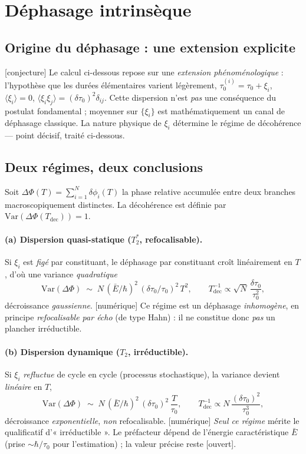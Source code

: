 \documentclass[11pt,a4paper]{article}
\newcommand{\statut}[1]{{\footnotesize\textsf{[#1]}}}
\theoremstyle{plain}
\theoremstyle{definition}
\theoremstyle{remark}
\begin{document}
\section{D\'ephasage intrins\`eque}\label{sec:deco}
\subsection{Origine du d\'ephasage : une extension explicite}\label{sec:disp}
\statut{conjecture} Le calcul ci-dessous repose sur une \emph{extension
ph\'enom\'enologique} : l'hypoth\`ese que les dur\'ees \'el\'ementaires varient l\'eg\`erement,
$\tau_0^{(i)}=\tau_0+\xi_i$, $\langle\xi_i\rangle=0$,
$\langle\xi_i\xi_j\rangle=(\delta\tau_0)^2\delta_{ij}$. Cette dispersion n'est
\emph{pas} une cons\'equence du postulat fondamental ; moyenner sur $\{\xi_i\}$ est
math\'ematiquement un canal de d\'ephasage classique. La nature physique de $\xi_i$
d\'etermine le r\'egime de d\'ecoh\'erence --- point d\'ecisif, trait\'e ci-dessous.

\subsection{Deux r\'egimes, deux conclusions}
Soit $\Delta\Phi(T)=\sum_{i=1}^{N}\delta\phi_i(T)$ la phase relative accumul\'ee entre
deux branches macroscopiquement distinctes. La d\'ecoh\'erence est d\'efinie par
$\mathrm{Var}(\Delta\Phi(T_{\mathrm{dec}}))=1$.

\paragraph{(a) Dispersion quasi-statique ($T_2^\ast$, refocalisable).} Si $\xi_i$ est
\emph{fig\'e} par constituant, le d\'ephasage par constituant cro\^it lin\'eairement en $T$,
d'o\`u une variance \emph{quadratique}
\[
\mathrm{Var}(\Delta\Phi)\;\sim\; N\,(\bar E/\hbar)^2\,(\delta\tau_0/\tau_0)^2\,T^2,
\qquad
T_{\mathrm{dec}}^{-1}\propto \sqrt{N}\,\frac{\delta\tau_0}{\tau_0^2},
\]
d\'ecroissance \emph{gaussienne}. \statut{num\'erique} Ce r\'egime est un d\'ephasage
\emph{inhomog\`ene}, en principe \emph{refocalisable par \'echo} (de type Hahn) : il
ne constitue donc \emph{pas} un plancher irr\'eductible.

\paragraph{(b) Dispersion dynamique ($T_2$, irr\'eductible).} Si $\xi_i$ \emph{refluctue}
de cycle en cycle (processus stochastique), la variance devient \emph{lin\'eaire} en
$T$,
\[
\mathrm{Var}(\Delta\Phi)\;\sim\; N\,(\bar E/\hbar)^2\,(\delta\tau_0)^2\,\frac{T}{\tau_0},
\qquad
T_{\mathrm{dec}}^{-1}\propto N\,\frac{(\delta\tau_0)^2}{\tau_0^3},
\]
d\'ecroissance \emph{exponentielle}, \emph{non} refocalisable. \statut{num\'erique}
\emph{Seul ce r\'egime} m\'erite le qualificatif d'« irr\'eductible ». Le pr\'efacteur
d\'epend de l'\'energie caract\'eristique $\bar E$ (prise $\sim\hbar/\tau_0$ pour
l'estimation) ; la valeur pr\'ecise reste \statut{ouvert}.
\end{document}
